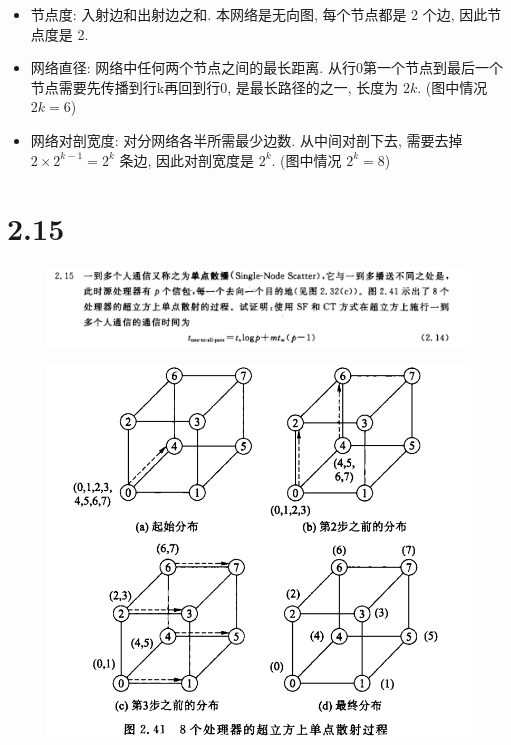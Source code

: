 \documentclass[UTF8]{article}
\begin{document}
\begin{itemize}
\item 节点度: 入射边和出射边之和. 本网络是无向图, 每个节点都是 2 个边, 因此节点度是 2.
\item 网络直径: 网络中任何两个节点之间的最长距离. 从行0第一个节点到最后一个节点需要先传播到行k再回到行0, 是最长路径的之一, 长度为 $2k$. (图中情况 $2k=6$)
\item 网络对剖宽度: 对分网络各半所需最少边数. 从中间对剖下去, 需要去掉 $2\times 2^{k-1}=2^k$ 条边, 因此对剖宽度是 $2^k$. (图中情况 $2^k=8$)
\end{itemize}

\section*{2.15}
\begin{center}
\begin{figure}[H]
	\centering
	\includegraphics[width=\linewidth]{image/2.15.png}
\end{figure}
\end{center}
\begin{center}
\begin{figure}[H]
	\centering
	\includegraphics[width=\linewidth*2/3]{image/2.15.image.png}
\end{figure}
\end{center}
\end{document}
